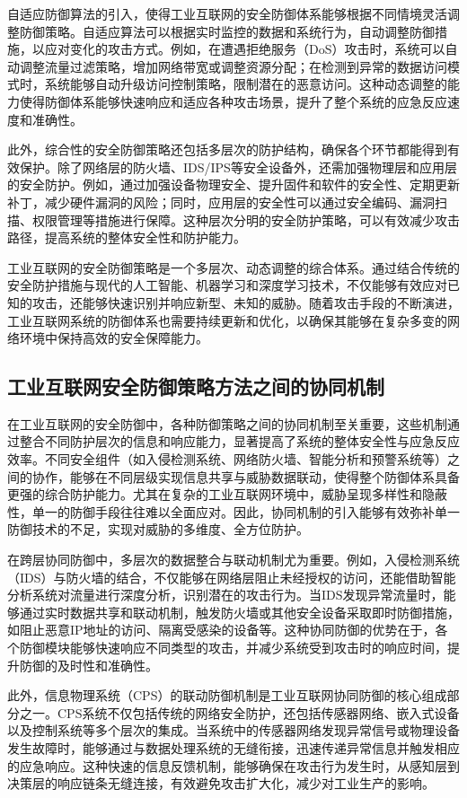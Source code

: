 自适应防御算法的引入，使得工业互联网的安全防御体系能够根据不同情境灵活调整防御策略。自适应算法可以根据实时监控的数据和系统行为，自动调整防御措施，以应对变化的攻击方式。例如，在遭遇拒绝服务（DoS）攻击时，系统可以自动调整流量过滤策略，增加网络带宽或调整资源分配；在检测到异常的数据访问模式时，系统能够自动升级访问控制策略，限制潜在的恶意访问。这种动态调整的能力使得防御体系能够快速响应和适应各种攻击场景，提升了整个系统的应急反应速度和准确性。

此外，综合性的安全防御策略还包括多层次的防护结构，确保各个环节都能得到有效保护。除了网络层的防火墙、IDS/IPS等安全设备外，还需加强物理层和应用层的安全防护。例如，通过加强设备物理安全、提升固件和软件的安全性、定期更新补丁，减少硬件漏洞的风险；同时，应用层的安全性可以通过安全编码、漏洞扫描、权限管理等措施进行保障。这种层次分明的安全防护策略，可以有效减少攻击路径，提高系统的整体安全性和防护能力。

工业互联网的安全防御策略是一个多层次、动态调整的综合体系。通过结合传统的安全防护措施与现代的人工智能、机器学习和深度学习技术，不仅能够有效应对已知的攻击，还能够快速识别并响应新型、未知的威胁。随着攻击手段的不断演进，工业互联网系统的防御体系也需要持续更新和优化，以确保其能够在复杂多变的网络环境中保持高效的安全保障能力。

\subsection{工业互联网安全防御策略方法之间的协同机制}

在工业互联网的安全防御中，各种防御策略之间的协同机制至关重要，这些机制通过整合不同防护层次的信息和响应能力，显著提高了系统的整体安全性与应急反应效率。不同安全组件（如入侵检测系统、网络防火墙、智能分析和预警系统等）之间的协作，能够在不同层级实现信息共享与威胁数据联动，使得整个防御体系具备更强的综合防护能力。尤其在复杂的工业互联网环境中，威胁呈现多样性和隐蔽性，单一的防御手段往往难以全面应对。因此，协同机制的引入能够有效弥补单一防御技术的不足，实现对威胁的多维度、全方位防护。

在跨层协同防御中，多层次的数据整合与联动机制尤为重要。例如，入侵检测系统（IDS）与防火墙的结合，不仅能够在网络层阻止未经授权的访问，还能借助智能分析系统对流量进行深度分析，识别潜在的攻击行为。当IDS发现异常流量时，能够通过实时数据共享和联动机制，触发防火墙或其他安全设备采取即时防御措施，如阻止恶意IP地址的访问、隔离受感染的设备等。这种协同防御的优势在于，各个防御模块能够快速响应不同类型的攻击，并减少系统受到攻击时的响应时间，提升防御的及时性和准确性。

此外，信息物理系统（CPS）的联动防御机制是工业互联网协同防御的核心组成部分之一。CPS系统不仅包括传统的网络安全防护，还包括传感器网络、嵌入式设备以及控制系统等多个层次的集成。当系统中的传感器网络发现异常信号或物理设备发生故障时，能够通过与数据处理系统的无缝衔接，迅速传递异常信息并触发相应的应急响应。这种快速的信息反馈机制，能够确保在攻击行为发生时，从感知层到决策层的响应链条无缝连接，有效避免攻击扩大化，减少对工业生产的影响。

